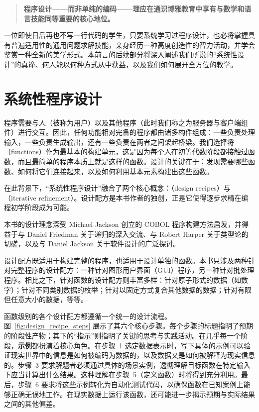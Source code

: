 \begin{quote}
\centering
\large\textbf{程序设计——而非单纯的编码——理应在通识博雅教育中享有与数学和语言技能同等重要的核心地位。}
\end{quote}

一位即使日后再也不写一行代码的学生，只要系统学习过程序设计，也必将掌握具有普遍适用性的通用问题求解技能，亲身经历一种高度创造性的智力活动，并学会鉴赏一种全新的美学形式。本前言的后续部分将深入阐述我们所说的“系统性设计”的真谛、何人能以何种方式从中获益，以及我们如何展开全方位的教学。


\section*{系统性程序设计}
\label{sec:preface:systematic_design}

程序需要与人（被称为用户）以及其他程序（此时我们称之为服务器与客户端组件）进行交互。因此，任何功能相对完备的程序都由诸多构件组成：一些负责处理输入，一些负责生成输出，还有一些负责在两者之间架起桥梁。我们选择将（functions）作为最基本的构建单元，这是因为每个人在初等代数阶段都接触过函数，而且最简单的程序本质上就是这样的函数。设计的关键在于：发现需要哪些函数、如何将它们连接起来，以及如何利用基本元素构建出这些函数。

在此背景下，“系统性程序设计”融合了两个核心概念：（design recipes）与（iterative refinement）。设计配方是本书作者的独创，正是它使得逐步求精在编程初学阶段成为可能。

\begin{notebox}[思想渊源]
本书的设计理念深受 Michael Jackson 创立的 COBOL 程序构建方法启发，并得益于与 Daniel Friedman 关于递归的深入交流、与 Robert Harper 关于类型论的切磋，以及与 Daniel Jackson 关于软件设计的广泛探讨。
\end{notebox}

设计配方既适用于构建完整的程序，也适用于设计单独的函数。本书只涉及两种针对完整程序的设计配方：一种针对图形用户界面（GUI）程序，另一种针对批处理程序。相比之下，针对函数的设计配方则丰富多样：针对原子形式的数据（如数字）；针对不同类别数据的枚举；针对以固定方式复合其他数据的数据；针对有限但任意大小的数据，等等。

函数级别的各个设计配方都遵循一个统一的设计流程。图~\ref{fig:design_recipe_steps} 展示了其六个核心步骤。每个步骤的标题指明了预期的阶段性产物；其下的“指示”则指明了关键的思考与实践活动。在几乎每一个阶段，\textbf{示例}都扮演着核心角色。在步骤~1 选定数据表示时，写下具体的示例可以验证现实世界中的信息是如何被编码为数据的，以及数据又是如何被解释为现实信息的。步骤~3 要求解题者必须通过具体的场景实例，透彻理解目标函数在特定输入下应当计算出什么结果。这种理解在步骤~5（定义函数）时将得到充分利用。最后，步骤~6 要求将这些示例转化为自动化测试代码，以确保函数在已知案例上能够正确无误地工作。在现实数据上运行该函数，还可能进一步揭示预期与实际结果之间的其他偏差。

